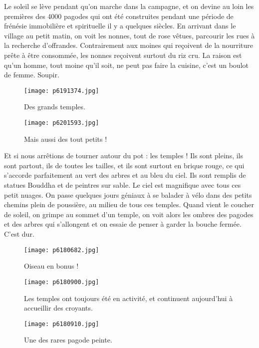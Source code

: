 \documentclass{book}
\begin{document}
Le soleil se lève pendant qu'on marche dans la campagne, et on devine au loin les premières des 4000 pagodes qui ont été construites pendant une période de frénésie immobilière et spirituelle il y a quelques siècles. En arrivant dans le village au petit matin, on voit les nonnes, tout de rose vêtues, parcourir les rues à la recherche d'offrandes. Contrairement aux moines qui reçoivent de la nourriture prête à être consommée, les nonnes reçoivent surtout du riz cru. La raison est qu'un homme, tout moine qu'il soit, ne peut pas faire la cuisine, c'est un boulot de femme. Soupir.


\begin{figure}[h]
\centering
\texttt{[image: p6191374.jpg]}
\caption*{Des grands temples.}
\end{figure}


\begin{figure}[h]
\centering
\texttt{[image: p6201593.jpg]}
\caption*{Mais aussi des tout petits !}
\end{figure}

Et si nous arrêtions de tourner autour du pot : les temples ! Ils sont pleins, ils sont partout, ils de toutes les tailles, et ils sont surtout en brique rouge, ce qui s'accorde parfaitement au vert des arbres et au bleu du ciel. Ils sont remplis de statues Bouddha et de peintres sur sable. Le ciel est magnifique avec tous ces petit nuages. On passe quelques jours géniaux à se balader à vélo dans des petits chemins plein de poussière, au milieu de tous ces temples. Quand vient le coucher de soleil, on grimpe au sommet d'un temple, on voit alors les ombres des pagodes et des arbres qui s'allongent et on essaie de penser à garder la bouche fermée. C'est dur.


\begin{figure}[h]
\centering
\texttt{[image: p6180682.jpg]}
\caption*{Oiseau en bonus !}
\end{figure}


\begin{figure}[h]
\centering
\texttt{[image: p6180900.jpg]}
\caption*{Les temples ont toujours été en activité, et continuent aujourd'hui à accueillir des croyants.}
\end{figure}


\begin{figure}[h]
\centering
\texttt{[image: p6180910.jpg]}
\caption*{Une des rares pagode peinte.}
\end{figure}
\end{document}
